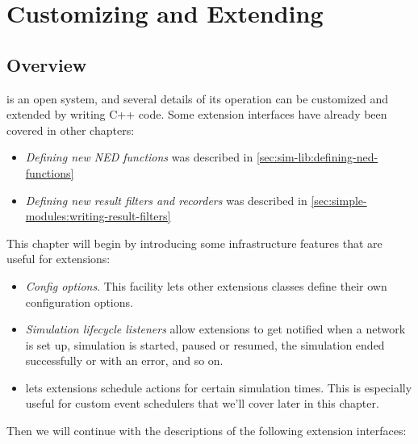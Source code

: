 \chapter{Customizing and Extending {\opp}}
\label{cha:plugin-exts}

\section{Overview}
\label{sec:plugin-exts:overview}

{\opp} is an open system, and several details of its operation can be
customized and extended by writing C++ code. Some extension interfaces
have already been covered in other chapters:

\begin{itemize}
   \item \textit{Defining new NED functions} was described in
     \ref{sec:sim-lib:defining-ned-functions}
   \item \textit{Defining new result filters and recorders} was described
     in \ref{sec:simple-modules:writing-result-filters}
\end{itemize}

This chapter will begin by introducing some infrastructure features that
are useful for extensions:

\begin{itemize}
   \item \textit{Config options}. This facility lets other extensions classes
     define their own configuration options.
   \item \textit{Simulation lifecycle listeners} allow extensions to get
     notified when a network is set up, simulation is started, paused or resumed,
     the simulation ended successfully or with an error, and so on.
   \item {} lets extensions schedule actions for certain simulation
     times. This is especially useful for custom event schedulers that we'll
     cover later in this chapter.
\end{itemize}

Then we will continue with the descriptions of the following extension
interfaces:

